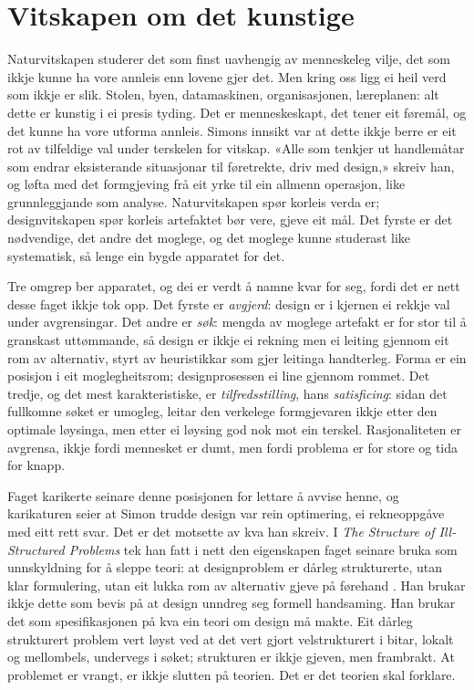 \section{Vitskapen om det kunstige}

Naturvitskapen studerer det som finst uavhengig av menneskeleg vilje, det som ikkje kunne ha vore annleis enn lovene gjer det. Men kring oss ligg ei heil verd som ikkje er slik. Stolen, byen, datamaskinen, organisasjonen, læreplanen: alt dette er kunstig i ei presis tyding. Det er menneskeskapt, det tener eit føremål, og det kunne ha vore utforma annleis. Simons innsikt var at dette ikkje berre er eit rot av tilfeldige val under terskelen for vitskap. «Alle som tenkjer ut handlemåtar som endrar eksisterande situasjonar til føretrekte, driv med design,» skreiv han, og løfta med det formgjeving frå eit yrke til ein allmenn operasjon, like grunnleggjande som analyse. Naturvitskapen spør korleis verda er; designvitskapen spør korleis artefaktet bør vere, gjeve eit mål. Det fyrste er det nødvendige, det andre det moglege, og det moglege kunne studerast like systematisk, så lenge ein bygde apparatet for det.

Tre omgrep ber apparatet, og dei er verdt å namne kvar for seg, fordi det er nett desse faget ikkje tok opp. Det fyrste er \emph{avgjerd}: design er i kjernen ei rekkje val under avgrensingar. Det andre er \emph{søk}: mengda av moglege artefakt er for stor til å granskast uttømmande, så design er ikkje ei rekning men ei leiting gjennom eit rom av alternativ, styrt av heuristikkar som gjer leitinga handterleg. Forma er ein posisjon i eit moglegheitsrom; designprosessen ei line gjennom rommet. Det tredje, og det mest karakteristiske, er \emph{tilfredsstilling}, hans \textit{satisficing}: sidan det fullkomne søket er umogleg, leitar den verkelege formgjevaren ikkje etter den optimale løysinga, men etter ei løysing god nok mot ein terskel. Rasjonaliteten er avgrensa, ikkje fordi mennesket er dumt, men fordi problema er for store og tida for knapp.

Faget karikerte seinare denne posisjonen for lettare å avvise henne, og karikaturen seier at Simon trudde design var rein optimering, ei rekneoppgåve med eitt rett svar. Det er det motsette av kva han skreiv. I \textit{The Structure of Ill-Structured Problems} tek han fatt i nett den eigenskapen faget seinare bruka som unnskyldning for å sleppe teori: at designproblem er dårleg strukturerte, utan klar formulering, utan eit lukka rom av alternativ gjeve på førehand \autocite{simon1973illstructured}. Han brukar ikkje dette som bevis på at design unndreg seg formell handsaming. Han brukar det som spesifikasjonen på kva ein teori om design må makte. Eit dårleg strukturert problem vert løyst ved at det vert gjort velstrukturert i bitar, lokalt og mellombels, undervegs i søket; strukturen er ikkje gjeven, men frambrakt. At problemet er vrangt, er ikkje slutten på teorien. Det er det teorien skal forklare.

